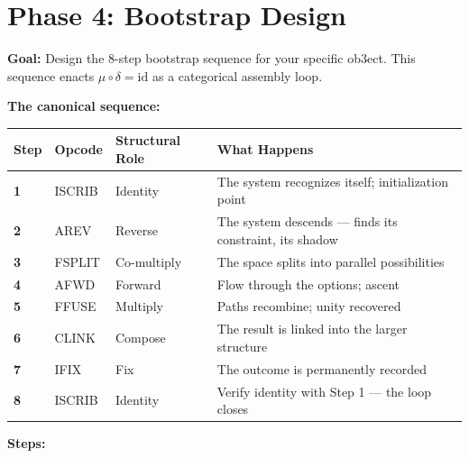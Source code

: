\documentclass[12pt,a4paper]{article}
\begin{document}
\section{Phase 4: Bootstrap Design}

{\bf Goal:} Design the 8-step bootstrap sequence for your specific ob3ect. This
sequence enacts $\mu \circ \delta = \mathrm{id}$ as a categorical assembly loop.

{\bf The canonical sequence:}

{\small
\begin{center}
\begin{tabularx}{\textwidth}{>{\bfseries}p{1.2cm} p{2cm} >{\raggedright\arraybackslash}p{3.2cm} X}
\toprule
{\bf Step} & {\bf Opcode} & {\bf Structural Role} & {\bf What Happens} \\
\midrule
1 & ISCRIB & Identity & The system recognizes itself; initialization point \\
2 & AREV & Reverse & The system descends — finds its constraint, its shadow \\
3 & FSPLIT & Co-multiply & The space splits into parallel possibilities \\
4 & AFWD & Forward & Flow through the options; ascent \\
5 & FFUSE & Multiply & Paths recombine; unity recovered \\
6 & CLINK & Compose & The result is linked into the larger structure \\
7 & IFIX & Fix & The outcome is permanently recorded \\
8 & ISCRIB & Identity & Verify identity with Step 1 — the loop closes \\
\bottomrule
\end{tabularx}
\end{center}
}

{\bf Steps:}
\end{document}
